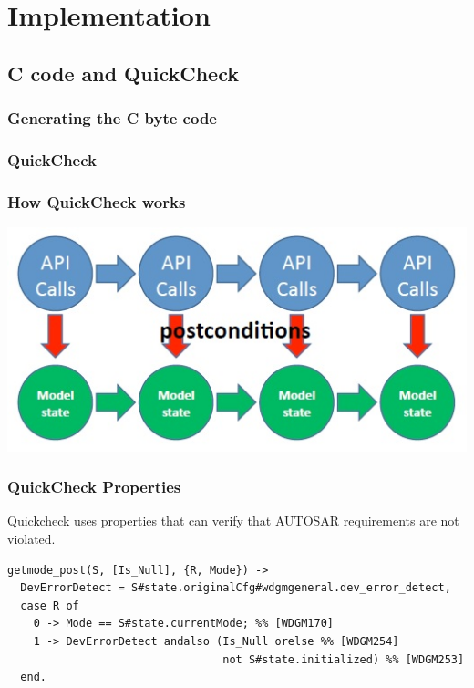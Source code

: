 \documentclass{beamer}
\begin{document}
\section{Implementation}
\subsection{C code and QuickCheck}
\begin{frame}
  \frametitle{Generating the C byte code}
  
\end{frame}

\begin{frame}
        \frametitle{QuickCheck}
\end{frame}

%   

\begin{frame}
  \frametitle{How QuickCheck works}
  \centerline{
    \includegraphics[keepaspectratio, width=0.7\linewidth]{api_calls}
  }
\end{frame}

\newcommand\Fontvi{\fontsize{6}{7.2}\selectfont}
\begin{frame}[fragile]
        \frametitle{QuickCheck Properties}
Quickcheck uses properties that can verify that AUTOSAR requirements are not
violated.
        \Fontvi
        \begin{lstlisting}[style=erlang]
getmode_post(S, [Is_Null], {R, Mode}) ->
  DevErrorDetect = S#state.originalCfg#wdgmgeneral.dev_error_detect,
  case R of
    0 -> Mode == S#state.currentMode; %% [WDGM170]
    1 -> DevErrorDetect andalso (Is_Null orelse %% [WDGM254]
                                 not S#state.initialized) %% [WDGM253]
  end.
        \end{lstlisting}
\end{frame}
\end{document}

